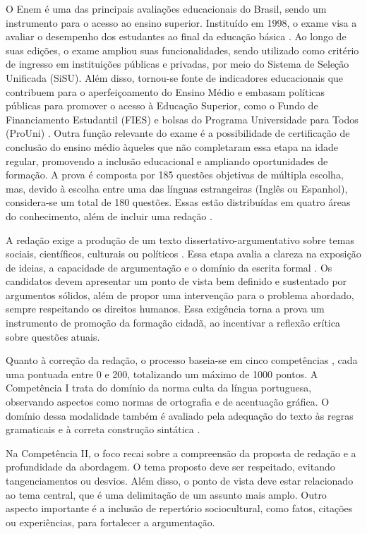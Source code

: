 \documentclass[portuguese]{textolivre}
\begin{document}
O Enem é uma das principais avaliações educacionais do Brasil, sendo um instrumento para o acesso ao ensino superior. Instituído em 1998, o exame visa a avaliar o desempenho dos estudantes ao final da educação básica \cite{coqueiro2025autoria}. Ao longo de suas edições, o exame ampliou suas funcionalidades, sendo utilizado como critério de ingresso em instituições públicas e privadas, por meio do Sistema de Seleção Unificada (SiSU). Além disso, tornou-se fonte de indicadores educacionais que contribuem para o aperfeiçoamento do Ensino Médio e embasam políticas públicas para promover o acesso à Educação Superior, como o Fundo de Financiamento Estudantil (FIES) e bolsas do Programa Universidade para Todos (ProUni) \cite{brasil2020portaria,briega2017surdo}. Outra função relevante do exame é a possibilidade de certificação de conclusão do ensino médio àqueles que não completaram essa etapa na idade regular, promovendo a inclusão educacional e ampliando oportunidades de formação. A prova é composta por 185 questões objetivas de múltipla escolha, mas, devido à escolha entre uma das línguas estrangeiras (Inglês ou Espanhol), considera-se um total de 180 questões. Essas estão distribuídas em quatro áreas do conhecimento, além de incluir uma redação \cite{inep2020edital}.

A redação exige a produção de um texto dissertativo-argumentativo sobre temas sociais, científicos, culturais ou políticos \cite{inep2023cartilha}. Essa etapa avalia a clareza na exposição de ideias, a capacidade de argumentação e o domínio da escrita formal \cite{Silva_de_Lima_Cavalcante_2023}. Os candidatos devem apresentar um ponto de vista bem definido e sustentado por argumentos sólidos, além de propor uma intervenção para o problema abordado, sempre respeitando os direitos humanos. Essa exigência torna a prova um instrumento de promoção da formação cidadã, ao incentivar a reflexão crítica sobre questões atuais.

Quanto à correção da redação, o processo baseia-se em cinco competências \cite{inepp}, cada uma pontuada entre 0 e 200, totalizando um máximo de 1000 pontos. A Competência I trata do domínio da norma culta da língua portuguesa, observando aspectos como normas de ortografia e de acentuação gráfica. O domínio dessa modalidade também é avaliado pela adequação do texto às regras gramaticais e à correta construção sintática \cite{inep2023cartilha}. 

Na Competência II, o foco recai sobre a compreensão da proposta de redação e a profundidade da abordagem. O tema proposto deve ser respeitado, evitando tangenciamentos ou desvios. Além disso, o ponto de vista deve estar relacionado ao tema central, que é uma delimitação de um assunto mais amplo. Outro aspecto importante é a inclusão de repertório sociocultural, como fatos, citações ou experiências, para fortalecer a argumentação.
\end{document}
